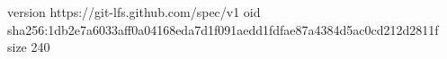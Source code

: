 version https://git-lfs.github.com/spec/v1
oid sha256:1db2e7a6033aff0a04168eda7d1f091aedd1fdfae87a4384d5ac0cd212d2811f
size 240
